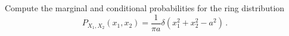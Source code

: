 

Compute the marginal and conditional probabilities for the ring distribution
\begin{equation*}
  P_{X_1, X_2}(x_1, x_2) = \frac{1}{\pi a} \delta (x_1^2 + x_2^2 - a^2)
  \, .
\end{equation*}


